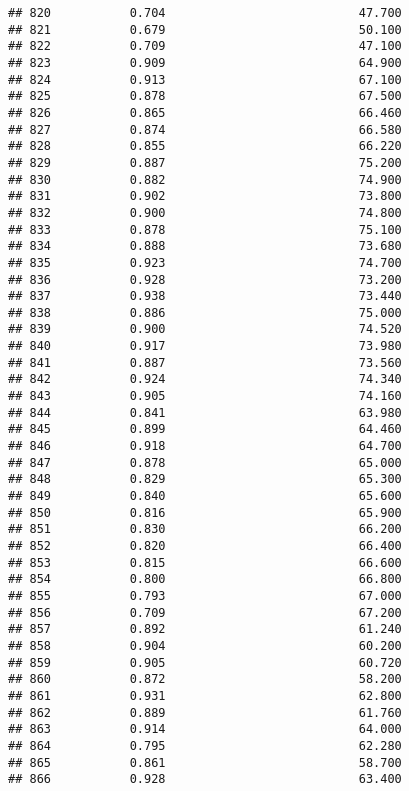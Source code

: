 \documentclass[
]{article}
\begin{document}
\begin{verbatim}
## 820           0.704                           47.700
## 821           0.679                           50.100
## 822           0.709                           47.100
## 823           0.909                           64.900
## 824           0.913                           67.100
## 825           0.878                           67.500
## 826           0.865                           66.460
## 827           0.874                           66.580
## 828           0.855                           66.220
## 829           0.887                           75.200
## 830           0.882                           74.900
## 831           0.902                           73.800
## 832           0.900                           74.800
## 833           0.878                           75.100
## 834           0.888                           73.680
## 835           0.923                           74.700
## 836           0.928                           73.200
## 837           0.938                           73.440
## 838           0.886                           75.000
## 839           0.900                           74.520
## 840           0.917                           73.980
## 841           0.887                           73.560
## 842           0.924                           74.340
## 843           0.905                           74.160
## 844           0.841                           63.980
## 845           0.899                           64.460
## 846           0.918                           64.700
## 847           0.878                           65.000
## 848           0.829                           65.300
## 849           0.840                           65.600
## 850           0.816                           65.900
## 851           0.830                           66.200
## 852           0.820                           66.400
## 853           0.815                           66.600
## 854           0.800                           66.800
## 855           0.793                           67.000
## 856           0.709                           67.200
## 857           0.892                           61.240
## 858           0.904                           60.200
## 859           0.905                           60.720
## 860           0.872                           58.200
## 861           0.931                           62.800
## 862           0.889                           61.760
## 863           0.914                           64.000
## 864           0.795                           62.280
## 865           0.861                           58.700
## 866           0.928                           63.400

\end{verbatim}
\end{document}

